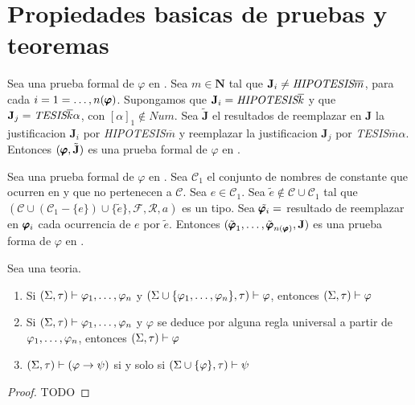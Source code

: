

\section{Propiedades basicas de pruebas y teoremas}

\begin{lemma}
  Sea \padec una prueba formal de $\varphi$ en \forder. Sea $m\in\mathbf{N}$ tal que 
  $\mathbf{J}_i\neq\emph{HIPOTESIS}\overline{m}$, para cada $i=1=\dots,n(\pmb{\varphi})$. Supongamos
  que $\mathbf{J}_i=\emph{HIPOTESIS}\overline{k}$ y que $\mathbf{J}_j=\emph{TESIS}\overline{k}\alpha$,
  con $[\alpha]_1\not\in Num$. Sea $\tilde{\mathbf{J}}$ el resultados de reemplazar en $\mathbf{J}$
  la justificacion $\mathbf{J}_i$ por \emph{HIPOTESIS}$\overline{m}$ y reemplazar la justificacion $\mathbf{J}_j$
  por \emph{TESIS}$\overline{m}\alpha$. Entonces $(\pmb{\varphi},\tilde{\mathbf{J}})$ es una prueba formal de 
  $\varphi$ en \forder.
\end{lemma}
\noproof

\begin{lemma}
  Sea \padec una prueba formal de $\varphi$ en \forder. Sea $\mathcal{C}_1$ el conjunto de nombres de constante 
  que ocurren en \pvarphi y que no pertenecen a $\mathcal{C}$. Sea $e\in \mathcal{C}_1$. Sea $\tilde{e}\not\in\mathcal{C}\cup\mathcal{C}_1$
  tal que $(\mathcal{C}\cup(\mathcal{C}_1-\{e\})\cup\{\tilde{e}\},\mathcal{F},\mathcal{R},a)$ es un tipo.
  Sea $\tilde{\pmb{\varphi}_i}=$ resultado de reemplazar en $\pmb{\varphi}_i$ cada ocurrencia de $e$ por $\tilde{e}$.
  Entonces $(\tilde{\pmb{\varphi}}_{1}, \dots, \tilde{\pmb{\varphi}}_{n(\pmb{\varphi})},\mathbf{J})$ es una prueba forma de $\varphi$ en \forder.
\end{lemma}
\noproof

\begin{lemma}
  Sea \forder una teoria. \begin{enumerate}
    \item Si $(\Sigma,\tau)\vdash\varphi_{1}, \dots, \varphi_{n}$ y $(\Sigma\cup\{\varphi_{1}, \dots, \varphi_{n}\},\tau)\vdash\varphi$, entonces $(\Sigma,\tau)\vdash\varphi$
    \item Si $(\Sigma,\tau)\vdash\varphi_{1}, \dots, \varphi_{n}$ y $\varphi$ se deduce por alguna regla universal a partir de $\varphi_{1}, \dots, \varphi_{n}$, entonces $(\Sigma,\tau)\vdash\varphi$
    \item $(\Sigma,\tau)\vdash(\varphi\rightarrow\psi)$ si y solo si $(\Sigma\cup\{\varphi\},\tau)\vdash\psi$
  \end{enumerate}
\end{lemma}
\begin{proof}
  TODO
\end{proof}

